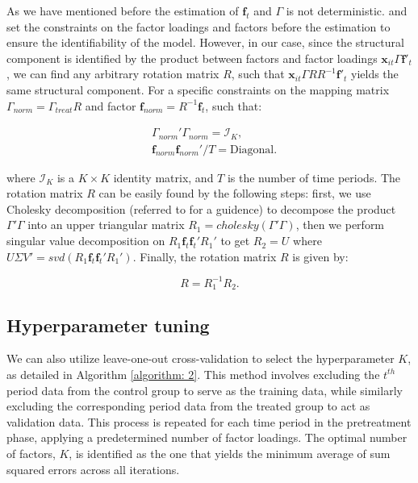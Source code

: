 \documentclass[12pt]{article}
\begin{document}
As we have mentioned before the estimation of $\bm{f}_{t}$ and $\Gamma$ is not deterministic. \cite{bai2009panel} and \cite{xu2017generalized} set the constraints on the factor loadings and factors before the estimation to ensure the identifiability of the model. However, in our case, since the structural component is identified by the product between factors and factor loadings $\bm{x}_{it}\Gamma \bm{f}'_{t}$, we can find any arbitrary rotation matrix $R$, such that $\bm{x}_{it}\Gamma R R^{-1}\bm{f}'_{t}$ yields the same structural component. For a specific constraints on the mapping matrix $\Gamma_{norm} = \Gamma_{treat}R$ and factor $\bm{f}_{norm} = R^{-1}\bm{f}_t$, such that:

\begin{equation}
\begin{aligned}
& \Gamma_{norm}'\Gamma_{norm} = \mathcal{I}_K, \\
& \bm{f}_{norm} \bm{f}_{norm}'/T = \text{Diagonal}.
\end{aligned}
\end{equation}

where $\mathcal{I}_K$ is a $K \times K$ identity matrix, and $T$ is the number of time periods. The rotation matrix $R$ can be easily found by the following steps: first, we use Cholesky decomposition (referred to \cite{higham2009cholesky} for a guidence) to decompose the product $\Gamma' \Gamma$ into an upper triangular matrix $R_1 = cholesky(\Gamma' \Gamma)$, then we perform singular value decomposition on $R_1\bm{f}_t\bm{f}_t'R_1'$ to get $R_2 = U$ where $U\Sigma V'=svd(R_1\bm{f}_t\bm{f}_t'R_1')$. Finally, the rotation matrix $R$ is given by:

\begin{equation}
R = R_1^{-1}R_2.
\end{equation}

\subsection{Hyperparameter tuning}
\label{sec: appendix hyperparameter}
We can also utilize leave-one-out cross-validation to select the hyperparameter $K$, as detailed in Algorithm \ref{algorithm: 2}. This method involves excluding the $t^{th}$ period data from the control group to serve as the training data, while similarly excluding the corresponding period data from the treated group to act as validation data. This process is repeated for each time period in the pretreatment phase, applying a predetermined number of factor loadings. The optimal number of factors, $K$, is identified as the one that yields the minimum average of sum squared errors across all iterations.
\end{document}
